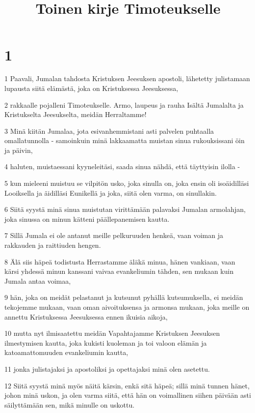 

\title{Toinen kirje Timoteukselle}


\chapter{1}

\par 1 Paavali, Jumalan tahdosta Kristuksen Jeesuksen apostoli, lähetetty julistamaan lupausta siitä elämästä, joka on Kristuksessa Jeesuksessa,
\par 2 rakkaalle pojalleni Timoteukselle. Armo, laupeus ja rauha Isältä Jumalalta ja Kristukselta Jeesukselta, meidän Herraltamme!
\par 3 Minä kiitän Jumalaa, jota esivanhemmistani asti palvelen puhtaalla omallatunnolla - samoinkuin minä lakkaamatta muistan sinua rukouksissani öin ja päivin,
\par 4 haluten, muistaessani kyyneleitäsi, saada sinua nähdä, että täyttyisin ilolla -
\par 5 kun mieleeni muistuu se vilpitön usko, joka sinulla on, joka ensin oli isoäidilläsi Looiksella ja äidilläsi Eunikellä ja joka, siitä olen varma, on sinullakin.
\par 6 Siitä syystä minä sinua muistutan virittämään palavaksi Jumalan armolahjan, joka sinussa on minun kätteni päällepanemisen kautta.
\par 7 Sillä Jumala ei ole antanut meille pelkuruuden henkeä, vaan voiman ja rakkauden ja raittiuden hengen.
\par 8 Älä siis häpeä todistusta Herrastamme äläkä minua, hänen vankiaan, vaan kärsi yhdessä minun kanssani vaivaa evankeliumin tähden, sen mukaan kuin Jumala antaa voimaa,
\par 9 hän, joka on meidät pelastanut ja kutsunut pyhällä kutsumuksella, ei meidän tekojemme mukaan, vaan oman aivoituksensa ja armonsa mukaan, joka meille on annettu Kristuksessa Jeesuksessa ennen ikuisia aikoja,
\par 10 mutta nyt ilmisaatettu meidän Vapahtajamme Kristuksen Jeesuksen ilmestymisen kautta, joka kukisti kuoleman ja toi valoon elämän ja katoamattomuuden evankeliumin kautta,
\par 11 jonka julistajaksi ja apostoliksi ja opettajaksi minä olen asetettu.
\par 12 Siitä syystä minä myös näitä kärsin, enkä sitä häpeä; sillä minä tunnen hänet, johon minä uskon, ja olen varma siitä, että hän on voimallinen siihen päivään asti säilyttämään sen, mikä minulle on uskottu.
